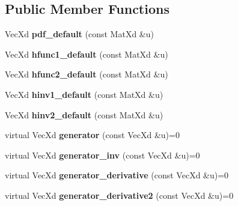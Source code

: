 \subsection*{Public Member Functions}
\begin{DoxyCompactItemize}
\item 
\hypertarget{class_archimedean_bicop_adee082ce9b2f7cc4a3408d67ed6b49f5}{Vec\+Xd {\bfseries pdf\+\_\+default} (const Mat\+Xd \&u)}\label{class_archimedean_bicop_adee082ce9b2f7cc4a3408d67ed6b49f5}

\item 
\hypertarget{class_archimedean_bicop_a912effaac24a1c94aa1e1d4b08819d75}{Vec\+Xd {\bfseries hfunc1\+\_\+default} (const Mat\+Xd \&u)}\label{class_archimedean_bicop_a912effaac24a1c94aa1e1d4b08819d75}

\item 
\hypertarget{class_archimedean_bicop_a1651e16c4534ca99cd58eaf8602b8525}{Vec\+Xd {\bfseries hfunc2\+\_\+default} (const Mat\+Xd \&u)}\label{class_archimedean_bicop_a1651e16c4534ca99cd58eaf8602b8525}

\item 
\hypertarget{class_archimedean_bicop_a5c5a8569bad4be9e92ccd4434305806b}{Vec\+Xd {\bfseries hinv1\+\_\+default} (const Mat\+Xd \&u)}\label{class_archimedean_bicop_a5c5a8569bad4be9e92ccd4434305806b}

\item 
\hypertarget{class_archimedean_bicop_a6bac4cee0e824719b107477a06caf19e}{Vec\+Xd {\bfseries hinv2\+\_\+default} (const Mat\+Xd \&u)}\label{class_archimedean_bicop_a6bac4cee0e824719b107477a06caf19e}

\item 
\hypertarget{class_archimedean_bicop_a9b79997308dc154a23808b84a863c563}{virtual Vec\+Xd {\bfseries generator} (const Vec\+Xd \&u)=0}\label{class_archimedean_bicop_a9b79997308dc154a23808b84a863c563}

\item 
\hypertarget{class_archimedean_bicop_af12082f1046554e0121b2c7d93148f13}{virtual Vec\+Xd {\bfseries generator\+\_\+inv} (const Vec\+Xd \&u)=0}\label{class_archimedean_bicop_af12082f1046554e0121b2c7d93148f13}

\item 
\hypertarget{class_archimedean_bicop_a9a18bbc021eb033c5b7d992d6d572b9b}{virtual Vec\+Xd {\bfseries generator\+\_\+derivative} (const Vec\+Xd \&u)=0}\label{class_archimedean_bicop_a9a18bbc021eb033c5b7d992d6d572b9b}

\item 
\hypertarget{class_archimedean_bicop_a16d7c2474e7e9bd16fa60a02550762ed}{virtual Vec\+Xd {\bfseries generator\+\_\+derivative2} (const Vec\+Xd \&u)=0}\label{class_archimedean_bicop_a16d7c2474e7e9bd16fa60a02550762ed}


\end{DoxyCompactItemize}
